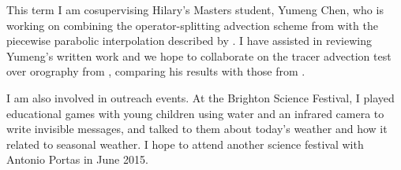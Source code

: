 \documentclass[a4paper]{article}
\begin{document}
This term I am cosupervising Hilary's Masters student, Yumeng Chen, who is working on combining the operator-splitting advection scheme from \citet{leonard1996} with the piecewise parabolic interpolation described by \citet{colella-woodward1984}.  I have assisted in reviewing Yumeng's written work and we hope to collaborate on the tracer advection test over orography from \citet{schaer2002}, comparing his results with those from \citet{shaw-weller2015}.

I am also involved in outreach events.  At the Brighton Science Festival, I played educational games with young children using water and an infrared camera to write invisible messages, and talked to them about today's weather and how it related to seasonal weather.  I hope to attend another science festival with Antonio Portas in June 2015.

                                                 

\end{document}
